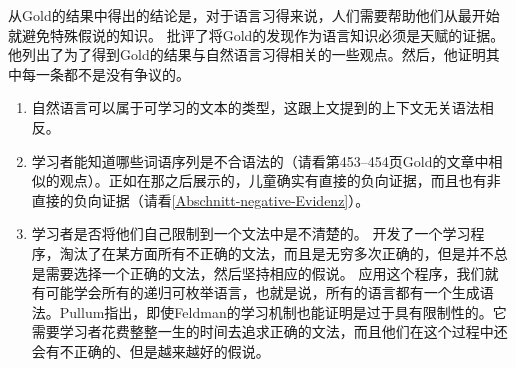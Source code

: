 从Gold的结果中得出的结论是，对于语言习得来说，人们需要帮助他们从最开始就避免特殊假说的知识。 批评了将Gold的发现作为语言知识必须是天赋的证据。他列出了为了得到Gold的结果与自然语言习得相关的一些观点。然后，他证明其中每一条都不是没有争议的。

\begin{enumerate}
\item 自然语言可以属于可学习的文本的类型，这跟上文提到的上下文无关语法相反。

\item 学习者能知道哪些词语序列是不合语法的（请看第453--454页Gold的文章中相似的观点）。正如在那之后展示的，儿童确实有直接的负向证据，而且也有非直接的负向证据（请看\ref{Abschnitt-negative-Evidenz}）。

\item 学习者是否将他们自己限制到一个文法中是不清楚的。 \citet{Feldman72a}开发了一个学习程序，淘汰了在某方面所有不正确的文法，而且是无穷多次正确的，但是并不总是需要选择一个正确的文法，然后坚持相应的假说。
  应用这个程序，我们就有可能学会所有的递归可枚举语言，也就是说，所有的语言都有一个生成语法。Pullum指出，即使Feldman的学习机制也能证明是过于具有限制性的。它需要学习者花费整整一生的时间去追求正确的文法，而且他们在这个过程中还会有不正确的、但是越来越好的假说。


\end{enumerate}
